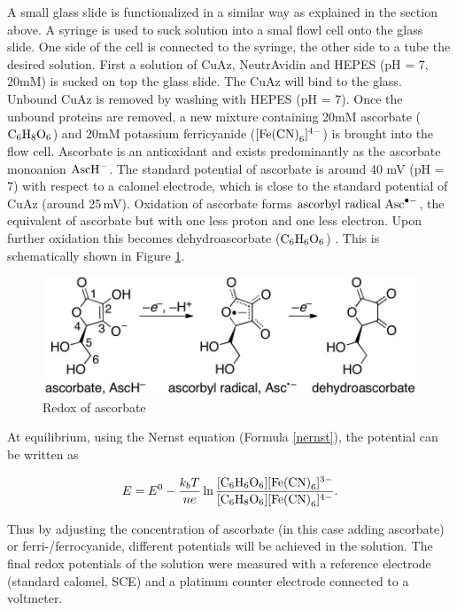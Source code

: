 \documentclass[twoside,single]{lion-msc}
\begin{document}
A small glass slide is functionalized in a similar way as explained in the section above. A syringe is used to suck solution into a smal flowl cell onto the glass slide. One side of the cell is connected to the syringe, the other side to a tube the desired solution. First a solution of CuAz, NeutrAvidin and HEPES (pH = 7, 20mM) is sucked on top the glass slide. The CuAz will bind to the glass. Unbound CuAz is removed by washing with HEPES (pH = 7). Once the unbound proteins are removed, a new mixture containing 20mM ascorbate ($\textup{C}_{6}\textup{H}_{8}\textup{O}_{6}$) and 20mM potassium ferricyanide ($[\textup{Fe(CN)}_{6}]^{4-}$) is brought into the flow cell. Ascorbate is an antioxidant and exists predominantly as the ascorbate monoanion  $\textup{AscH}^{-}$. The standard potential of ascorbate is around 40 mV (pH = 7) \cite{Creutz1981} with respect to a calomel electrode, which is close to the standard potential of CuAz (around 25\,mV). Oxidation of ascorbate forms $\textup{ascorbyl radical Asc}^{\bullet  -}$, the equivalent of ascorbate but with one less proton and one less electron. Upon further oxidation this becomes dehydroascorbate ($\textup{C}_{6}\textup{H}_{6}\textup{O}_{6}$) \cite{Warren2010}. This is schematically shown in Figure \ref{redox_asc}.

\begin{figure}[ht!]
\centering
\includegraphics[width=\textwidth]{redox_asc}
\caption{Redox of ascorbate}
\label{redox_asc}
\end{figure}

At equilibrium, using the Nernst equation (Formula \ref{nernst}), the potential can be written as

\begin{equation}
E = E^{0} - \frac{k_{b}T}{ne} \ln \frac{[\textup{C}_{6}\textup{H}_{6}\textup{O}_{6}][\textup{Fe(CN)}_{6}]^{3-}}{[\textup{C}_{6}\textup{H}_{8}\textup{O}_{6}][\textup{Fe(CN)}_{6}]^{4-}}.
\end{equation}

Thus by adjusting the concentration of ascorbate (in this case adding ascorbate) or ferri-/ferrocyanide, different potentials will be achieved in the solution. The final redox potentials of the solution were measured with a reference electrode (standard calomel, SCE) and a platinum counter electrode connected to a voltmeter.
\end{document}
